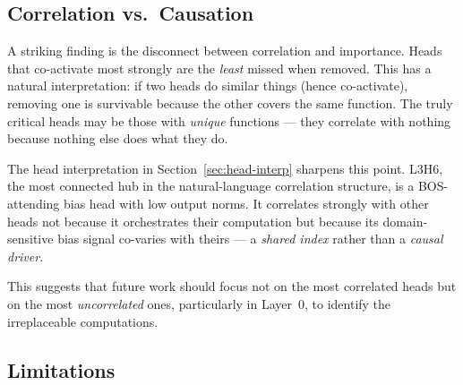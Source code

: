 \documentclass[11pt,a4paper]{article}
\begin{document}
\subsection{Correlation vs.\ Causation}

A striking finding is the disconnect between correlation and importance.
Heads that co-activate most strongly are the \emph{least} missed when removed.
This has a natural interpretation: if two heads do similar things (hence co-activate), removing one is survivable because the other covers the same function.
The truly critical heads may be those with \emph{unique} functions --- they correlate with nothing because nothing else does what they do.

The head interpretation in Section~\ref{sec:head-interp} sharpens this point.
L3H6, the most connected hub in the natural-language correlation structure, is a BOS-attending bias head with low output norms.
It correlates strongly with other heads not because it orchestrates their computation but because its domain-sensitive bias signal co-varies with theirs --- a \emph{shared index} rather than a \emph{causal driver}.

This suggests that future work should focus not on the most correlated heads but on the most \emph{uncorrelated} ones, particularly in Layer~0, to identify the irreplaceable computations.

\subsection{Limitations}
\end{document}
